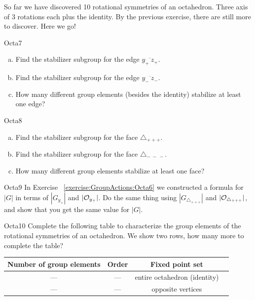 So far we have discovered 10 rotational symmetries of an octahedron.  Three axis of 3 rotations each plus the identity.  By the previous exercise, there are still more to discover.  Here we go! 

\begin{exercise}{Octa7}
\begin{enumerate}[(a)]
\item Find the stabilizer subgroup for the edge $\overline{y_+~z_+}$. 
\item Find the stabilizer subgroup for the edge $\overline{y_-~z_-}$.
\item How many different group elements (besides the identity) stabilize at least one edge?
\end{enumerate}
\end{exercise}	

\begin{exercise}{Octa8}
\begin{enumerate}[(a)]
\item Find the stabilizer subgroup for the face $\triangle_{+ + +}$.
\item Find the stabilizer subgroup for the face $\triangle_{ -~-~-}$.
\item How many different group elements stabilize at least one face?
\end {enumerate}
\end{exercise}

\begin{exercise}{Octa9}
In Exercise ~\ref{exercise:GroupActions:Octa6} we constructed a formula for $|G|$ in terms of $|G_{y_+}|$ and $|{\cal O}_{y_+}|$. Do the same thing using $|G_{\triangle_{+ + +}}|$ and $|{\cal O}_{\triangle_{+ + +}}|$, and show that you get the same value for $|G|$.
\end{exercise}

\begin{exercise}{Octa10}
Complete the following table to characterize the group elements of the rotational symmetries of an octahedron.  We show two rows, how many more to complete the table? 
 
\begin{tabular}{| c |c|c| r |} \hline
 \textbf{ Number of group elements} & \textbf{Order} & \textbf{Fixed point set} \\ \hline
  ---&  ---& entire  octahedron (identity) \\ \hline
  --- & ---&  opposite vertices \\

\end{tabular}
\end{exercise}

